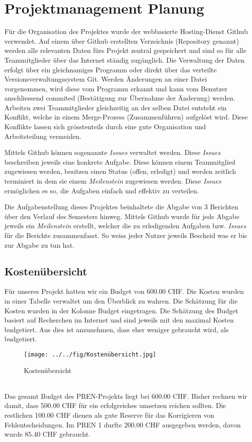 \section{Projektmanagement Planung}
Für die Organisation des Projektes wurde der webbasierte Hosting-Dienst Github verwendet. Auf einem über Github erstellten Verzeichnis (Repository genannt) werden alle relevanten Daten fürs Projekt zentral gespeichert und sind so für alle Teammitglieder über das Internet ständig zugänglich. Die Verwaltung der Daten erfolgt über ein gleichnamiges Programm oder direkt über das verteilte Versionsverwaltungssystem Git. Werden Änderungen an einer Datei vorgenommen, wird diese vom Programm erkannt und kann vom Benutzer anschliessend commited (Bestätigung zur Übernahme der Änderung) werden. Arbeiten zwei Teammitglieder gleichzeitig an der selben Datei entsteht ein Konflikt, welche in einem Merge-Prozess (Zusammenführen) aufgelöst wird. Diese Konflikte lassen sich grösstenteils durch eine gute Organisation und Arbeitsteilung vermeiden.

Mittels Github können sogenannte \emph{Issues} verwaltet werden. Diese \emph{Issues} beschreiben jeweils eine konkrete Aufgabe. Diese können einem Teammitglied zugewiesen werden, besitzen einen Status (offen, erledigt) und werden zeitlich terminiert in dem sie einem \emph{Meilenstein} zugewiesen werden. Diese \emph{Issues} ermöglichen es so, die Aufgaben einfach und effektiv zu verteilen.

Die Aufgabenstellung dieses Projektes beinhaltete die Abgabe von 3 Berichten über den Verlauf des Semesters hinweg. Mittels Github wurde für jede Abgabe jeweils ein \emph{Meilenstein} erstellt, welcher die zu erledigenden Aufgaben bzw. \emph{Issues} für die Berichte zusammenfasst. So weiss jeder Nutzer jeweils Bescheid was er bis zur Abgabe zu tun hat.

\subsection{Kostenübersicht}
Für unseres Projekt hatten wir ein Budget von 600.00 CHF. Die Kosten wurden in einer Tabelle verwaltet um den Überblick zu wahren. Die Schätzung für die Kosten wurden in der Kolonne Budget eingetragen. Die Schätzung des Budget basiert auf Recherchen im Internet und sind jeweils mit den maximal Kosten budgetiert. Aus dies ist anzunehmen, dass eher weniger gebraucht wird, als budgetiert. \\
\begin{figure}[h!]
	\center
	\texttt{[image: ../../fig/Kostenübersicht.jpg]}
	\caption{Kostenübersicht}
	\label{fig:Kostenübersicht}
\end{figure}\\
	Das gesamt Budget des PREN-Projekts liegt bei 600.00 CHF. Bisher rechnen wir damit, dass 500.00 CHF für ein erfolgreiches umsetzen reichen sollten. Die restlichen 100.00 CHF dienen als gute Reserve für das Korrigieren von Fehlentscheidungen. Im PREN 1 durfte 200.00 CHF ausgegeben werden, davon wurde 85.40 CHF gebraucht. 







